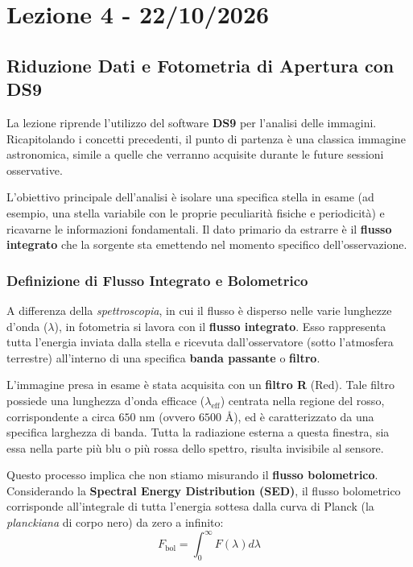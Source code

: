 \chapter{Lezione 4 - 22/10/2026}

\section{Riduzione Dati e Fotometria di Apertura con DS9}

La lezione riprende l'utilizzo del software \textbf{DS9} per l'analisi delle immagini. Ricapitolando i concetti precedenti, il punto di partenza è una classica immagine astronomica, simile a quelle che verranno acquisite durante le future sessioni osservative.

L'obiettivo principale dell'analisi è isolare una specifica stella in esame (ad esempio, una stella variabile con le proprie peculiarità fisiche e periodicità) e ricavarne le informazioni fondamentali. Il dato primario da estrarre è il \textbf{flusso integrato} che la sorgente sta emettendo nel momento specifico dell'osservazione.

\subsection{Definizione di Flusso Integrato e Bolometrico}

A differenza della \textit{spettroscopia}, in cui il flusso è disperso nelle varie lunghezze d'onda ($\lambda$), in fotometria si lavora con il \textbf{flusso integrato}. Esso rappresenta tutta l'energia inviata dalla stella e ricevuta dall'osservatore (sotto l'atmosfera terrestre) all'interno di una specifica \textbf{banda passante} o \textbf{filtro}.

L'immagine presa in esame è stata acquisita con un \textbf{filtro R} (Red). Tale filtro possiede una lunghezza d'onda efficace ($\lambda_{\text{eff}}$) centrata nella regione del rosso, corrispondente a circa $650 \text{ nm}$ (ovvero $6500 \text{ \AA}$), ed è caratterizzato da una specifica larghezza di banda. Tutta la radiazione esterna a questa finestra, sia essa nella parte più blu o più rossa dello spettro, risulta invisibile al sensore.

Questo processo implica che non stiamo misurando il \textbf{flusso bolometrico}. Considerando la \textbf{Spectral Energy Distribution (SED)}, il flusso bolometrico corrisponde all'integrale di tutta l'energia sottesa dalla curva di Planck (la \textit{planckiana} di corpo nero) da zero a infinito:
\begin{equation}
F_{\text{bol}} = \int_{0}^{\infty} F(\lambda) d\lambda
\end{equation}

